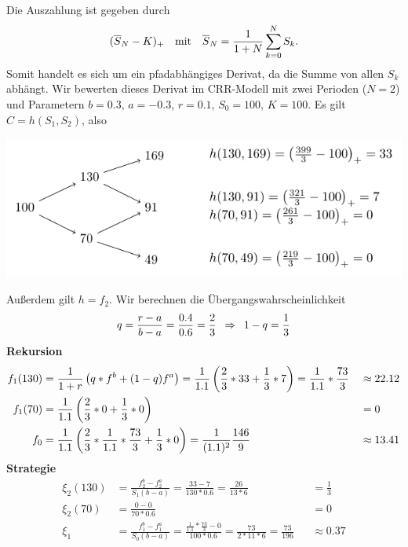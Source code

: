 \begin{*beispiel}
	Die Auszahlung ist gegeben durch 
	\begin{equation*}
		(\overline{S}_N - K)_+ 
		\quad \text{mit} \quad 
		\overline{S}_N = \frac{1}{1+N} \sum_{k=0}^{N} S_k .
	\end{equation*}
	Somit handelt es sich um ein pfadabhängiges Derivat, da die Summe von allen $S_k$ abhängt. 
	Wir bewerten dieses Derivat im CRR-Modell mit zwei Perioden ($N=2$) und Parametern $b = 0.3$, $a = -0.3$, $r=0.1$, $S_0 = 100$, $K=100$. 
	Es gilt $C = h(S_1, S_2)$, also
	
	\begin{center}
		\includegraphics[]{./img/asian-call}
	\end{center}

	
	Außerdem gilt $h = f_2$. Wir berechnen die Übergangswahrscheinlichkeit
	\begin{equation*}
		q = \frac{r-a}{b-a} = \frac{0.4}{0.6} = \frac{2}{3} \enskip \Rightarrow \enskip 1 - q = \frac{1}{3}
	\end{equation*}
	\textbf{Rekursion}
	\begin{align*}
		f_1(130) &= \frac{1}{1+r} \left( q * f^b + (1-q) f^a \right) 
		= \frac{1}{1.1} \left( \frac{2}{3} * 33 + \frac{1}{3} * 7 \right) 
		= \frac{1}{1.1} * \frac{73}{3} 
		&&\approx 22.12 \\
		f_1(70) &= \frac{1}{1.1} \left( \frac{2}{3} * 0 + \frac{1}{3} * 0 \right) &&= 0 \\
		f_0 &= \frac{1}{1.1} \left( \frac{2}{3} * \frac{1}{1.1} * \frac{73}{3} + \frac{1}{3} * 0 \right) = \frac{1}{(1.1)^2} \frac{146}{9} &&\approx 13.41 
	\end{align*}
	\textbf{Strategie}
	\begin{align*}
		\xi_2(130) &= \frac{f_2^b - f_2^a}{S_1 (b-a)} = \frac{33 - 7}{130 * 0.6} = \frac{26}{13*6} &&= \frac{1}{3} \\
		\xi_2(70) &= \frac{0-0}{70 * 0.6} &&= 0 \\
		\xi_1 &= \frac{f_1^b - f_1^a}{S_0 (b-a)} = \frac{\frac{1}{1.1} * \frac{73}{3} - 0}{100 * 0.6} = \frac{73}{2*11*6} = \frac{73}{196} &&\approx 0.37
	\end{align*}
\end{*beispiel}


